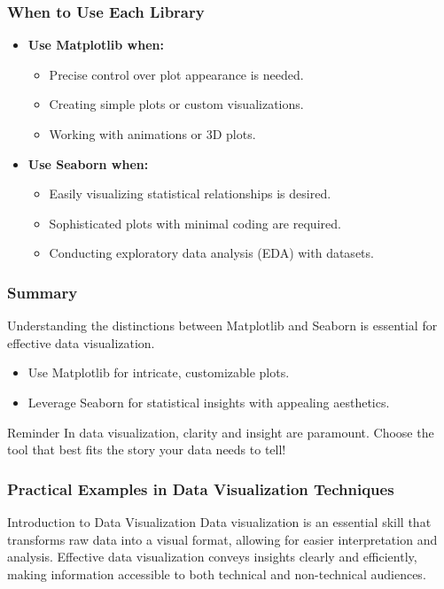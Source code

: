 \documentclass[aspectratio=169]{beamer}
\begin{document}
\begin{frame}[t]
  \frametitle{When to Use Each Library}
  \begin{itemize}
    \item \textbf{Use Matplotlib when:}
      \begin{itemize}
        \item Precise control over plot appearance is needed.
        \item Creating simple plots or custom visualizations.
        \item Working with animations or 3D plots.
      \end{itemize}
    \item \textbf{Use Seaborn when:}
      \begin{itemize}
        \item Easily visualizing statistical relationships is desired.
        \item Sophisticated plots with minimal coding are required.
        \item Conducting exploratory data analysis (EDA) with datasets.
      \end{itemize}
\end{itemize}
\end{frame}

\begin{frame}[t]
  \frametitle{Summary}
  Understanding the distinctions between Matplotlib and Seaborn is essential for effective data visualization. 
  \begin{itemize}
    \item Use Matplotlib for intricate, customizable plots.
    \item Leverage Seaborn for statistical insights with appealing aesthetics.
  \end{itemize}
  \begin{block}{Reminder}
    In data visualization, clarity and insight are paramount. Choose the tool that best fits the story your data needs to tell!
  \end{block}
\end{frame}

\begin{frame}[fragile]
  \frametitle{Practical Examples in Data Visualization Techniques}
  
  \begin{block}{Introduction to Data Visualization}
    Data visualization is an essential skill that transforms raw data into a visual format, allowing for easier interpretation and analysis. Effective data visualization conveys insights clearly and efficiently, making information accessible to both technical and non-technical audiences.
  \end{block}
\end{frame}
\end{document}

